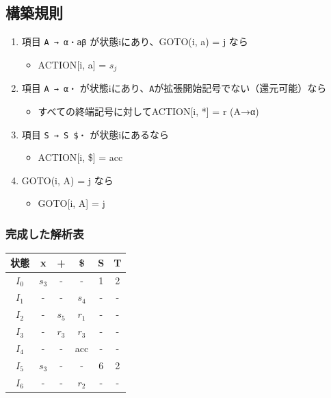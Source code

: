 \subsection{構築規則}

\begin{enumerate}
\item
  項目 \texttt{A\ →\ α・aβ} が状態iにあり、GOTO(i, a) = j なら

\begin{itemize}
\item
  ACTION{[}i, a{]} = \(s_j\)
\end{itemize}

\item
  項目 \texttt{A\ →\ α・} が状態iにあり、\texttt{A}が拡張開始記号でない（還元可能）なら

\begin{itemize}
\item
  すべての終端記号に対してACTION{[}i, *{]} = r (A→α)
\end{itemize}

\item
  項目 \texttt{S\textquotesingle{}\ →\ S\ \$・} が状態iにあるなら

\begin{itemize}
\item
  ACTION{[}i, \${]} = acc
\end{itemize}

\item
  GOTO(i, A) = j なら

\begin{itemize}
\item
  GOTO{[}i, A{]} = j
\end{itemize}
\end{enumerate}

\subsubsection{完成した解析表}

\begin{table}[htb]
  \begin{flushleft}
  \begin{tabular}{cccccc}\hline
状態 & x & + & \$ & S & T\\ \hline
\(I_0\) & \(s_3\) & - & - & 1 & 2\\ \hline
\(I_1\) & - & - & \(s_4\) & - & -\\ \hline
\(I_2\) & - & \(s_5\) & \(r_1\) & - & -\\ \hline
\(I_3\) & - & \(r_3\) & \(r_3\) & - & -\\ \hline
\(I_4\) & - & - & acc & - & -\\ \hline
\(I_5\) & \(s_3\) & - & - & 6 & 2\\ \hline
\(I_6\) & - & - & \(r_2\) & - & -\\ \hline
  \end{tabular}
  \end{flushleft}
\end{table}

